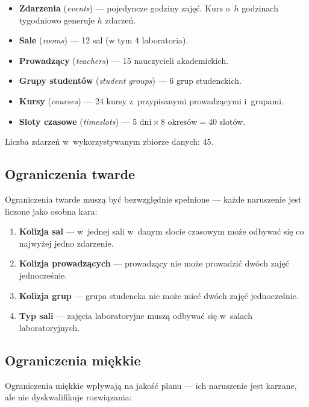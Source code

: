 \documentclass[12pt,a4paper]{article}
\begin{document}
\begin{itemize}
  \item \textbf{Zdarzenia} (\textit{events}) --- pojedyncze godziny zaj\k{e}\'{c}. Kurs o~$h$ godzinach tygodniowo generuje $h$ zdarze\'{n}.
  \item \textbf{Sale} (\textit{rooms}) --- 12 sal (w tym 4 laboratoria).
  \item \textbf{Prowadz\k{a}cy} (\textit{teachers}) --- 15 nauczycieli akademickich.
  \item \textbf{Grupy student\'{o}w} (\textit{student groups}) --- 6 grup studenckich.
  \item \textbf{Kursy} (\textit{courses}) --- 24 kursy z~przypisanymi prowadz\k{a}cymi i~grupami.
  \item \textbf{Sloty czasowe} (\textit{timeslots}) --- $5 \text{ dni} \times 8 \text{ okres\'{o}w} = 40$ slot\'{o}w.
\end{itemize}

Liczba zdarze\'{n} w~wykorzystywanym zbiorze danych: 45.

\subsection{Ograniczenia twarde}

Ograniczenia twarde musz\k{a} by\'{c} bezwzgl\k{e}dnie spe\l{}nione --- ka\.{z}de naruszenie jest liczone jako osobna kara:

\begin{enumerate}
  \item \textbf{Kolizja sal} --- w~jednej sali w~danym slocie czasowym mo\.{z}e odbywa\'{c} si\k{e} co najwy\.{z}ej jedno zdarzenie.
  \item \textbf{Kolizja prowadz\k{a}cych} --- prowadz\k{a}cy nie mo\.{z}e prowadzi\'{c} dw\'{o}ch zaj\k{e}\'{c} jednocze\'{s}nie.
  \item \textbf{Kolizja grup} --- grupa studencka nie mo\.{z}e mie\'{c} dw\'{o}ch zaj\k{e}\'{c} jednocze\'{s}nie.
  \item \textbf{Typ sali} --- zaj\k{e}cia laboratoryjne musz\k{a} odbywa\'{c} si\k{e} w~salach laboratoryjnych.
\end{enumerate}

\subsection{Ograniczenia mi\k{e}kkie}

Ograniczenia mi\k{e}kkie wp\l{}ywaj\k{a} na jako\'{s}\'{c} planu --- ich naruszenie jest karzane, ale nie dyskwalifikuje rozwi\k{a}zania:
\end{document}
